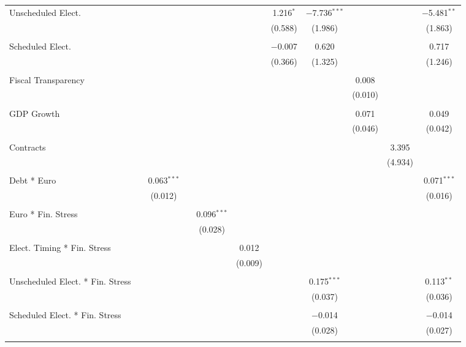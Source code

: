 \begin{table}[!htbp]
\begin{tabular}{@{\extracolsep{5pt}}lcccccccccc}
 Unscheduled Elect. &  &  &  &  &  & 1.216$^{*}$ & $-$7.736$^{***}$ &  &  & $-$5.481$^{**}$ \\ 
  &  &  &  &  &  & (0.588) & (1.986) &  &  & (1.863) \\ 
  & & & & & & & & & & \\ 
 Scheduled Elect. &  &  &  &  &  & $-$0.007 & 0.620 &  &  & 0.717 \\ 
  &  &  &  &  &  & (0.366) & (1.325) &  &  & (1.246) \\ 
  & & & & & & & & & & \\ 
 Fiscal Transparency &  &  &  &  &  &  &  & 0.008 &  &  \\ 
  &  &  &  &  &  &  &  & (0.010) &  &  \\ 
  & & & & & & & & & & \\ 
 GDP Growth &  &  &  &  &  &  &  & 0.071 &  & 0.049 \\ 
  &  &  &  &  &  &  &  & (0.046) &  & (0.042) \\ 
  & & & & & & & & & & \\ 
 Contracts &  &  &  &  &  &  &  &  & 3.395 &  \\ 
  &  &  &  &  &  &  &  &  & (4.934) &  \\ 
  & & & & & & & & & & \\ 
 Debt * Euro &  & 0.063$^{***}$ &  &  &  &  &  &  &  & 0.071$^{***}$ \\ 
  &  & (0.012) &  &  &  &  &  &  &  & (0.016) \\ 
  & & & & & & & & & & \\ 
 Euro * Fin. Stress &  &  &  & 0.096$^{***}$ &  &  &  &  &  &  \\ 
  &  &  &  & (0.028) &  &  &  &  &  &  \\ 
  & & & & & & & & & & \\ 
 Elect. Timing * Fin. Stress &  &  &  &  & 0.012 &  &  &  &  &  \\ 
  &  &  &  &  & (0.009) &  &  &  &  &  \\ 
  & & & & & & & & & & \\ 
 Unscheduled Elect. * Fin. Stress &  &  &  &  &  &  & 0.175$^{***}$ &  &  & 0.113$^{**}$ \\ 
  &  &  &  &  &  &  & (0.037) &  &  & (0.036) \\ 
  & & & & & & & & & & \\ 
 Scheduled Elect. * Fin. Stress &  &  &  &  &  &  & $-$0.014 &  &  & $-$0.014 \\ 
  &  &  &  &  &  &  & (0.028) &  &  & (0.027) \\ 
  & & & & & & & & & & \\ 

\end{tabular}
\end{table}
